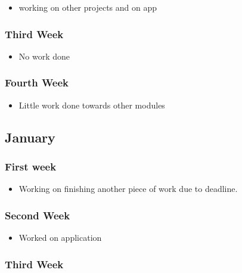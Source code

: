 \begin{itemize}
\tightlist
\item
  working on other projects and on app
\end{itemize}

\subsubsection{Third Week}\label{third-week-1}

\begin{itemize}
\tightlist
\item
  No work done
\end{itemize}

\subsubsection{Fourth Week}\label{fourth-week-1}

\begin{itemize}
\tightlist
\item
  Little work done towards other modules
\end{itemize}

\subsection{January}\label{january}

\subsubsection{First week}\label{first-week-3}

\begin{itemize}
\tightlist
\item
  Working on finishing another piece of work due to deadline.
\end{itemize}

\subsubsection{Second Week}\label{second-week-3}

\begin{itemize}
\tightlist
\item
  Worked on application
\end{itemize}

\subsubsection{Third Week}\label{third-week-2}

